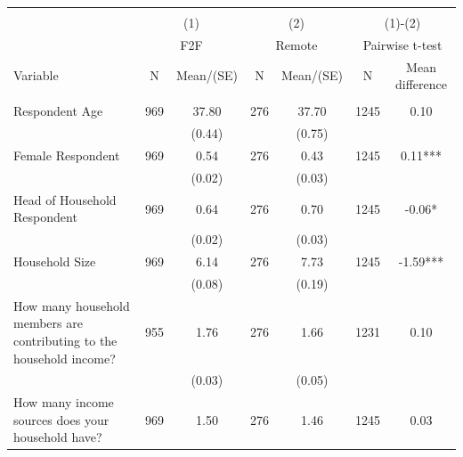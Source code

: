 
\begin{tabular}{@{\extracolsep{5pt}}lcccccc}
\\[-1.8ex]\hline \hline \\[-1.8ex]
 & \multicolumn{2}{c}{(1)}  & \multicolumn{2}{c}{(2)}  & \multicolumn{2}{c}{(1)-(2)} \\
 & \multicolumn{2}{c}{F2F}  & \multicolumn{2}{c}{Remote}  & \multicolumn{2}{c}{Pairwise t-test}  \\
Variable & N & Mean/(SE) & N & Mean/(SE) & N & Mean difference \\ \hline \\[-1.8ex] 
Respondent Age   & 969    & 37.80    & 276    & 37.70    & 1245    & 0.10   \\
 &   & (0.44)  &   & (0.75)  &   &  \\ [1ex]
Female Respondent   & 969    & 0.54    & 276    & 0.43    & 1245    & 0.11***   \\
 &   & (0.02)  &   & (0.03)  &   &  \\ [1ex]
Head of Household Respondent   & 969    & 0.64    & 276    & 0.70    & 1245    & -0.06*   \\
 &   & (0.02)  &   & (0.03)  &   &  \\ [1ex]
Household Size   & 969    & 6.14    & 276    & 7.73    & 1245    & -1.59***   \\
 &   & (0.08)  &   & (0.19)  &   &  \\ [1ex]
How many household members are contributing to the household income?   & 955    & 1.76    & 276    & 1.66    & 1231    & 0.10   \\
 &   & (0.03)  &   & (0.05)  &   &  \\ [1ex]
How many income sources does your household have?   & 969    & 1.50    & 276    & 1.46    & 1245    & 0.03   \\

\end{tabular}
